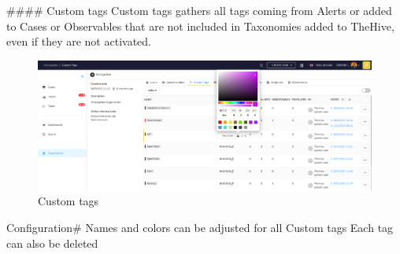 


\begin{markdown}
#### Custom tags
Custom tags gathers all tags coming from Alerts or added to Cases or Observables that are not included in Taxonomies added to TheHive, even if they are not activated.
\end{markdown}

\begin{figure}[H]
    \centering
    \includegraphics[width=\textwidth]{images/docs/org_admin/tags/organisatsion-custom-tags.png}
    \caption{Custom tags}
    \label{fig:modules}
\end{figure}

Configuration#
Names and colors can be adjusted for all Custom tags
Each tag can also be deleted

